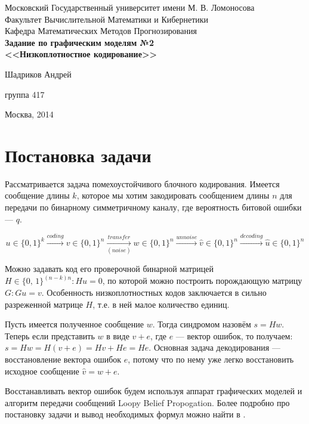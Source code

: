 \documentclass[12pt,a4paper]{article}
\begin{document}
\begin{titlepage}
\begin{center}
  Московский Государственный университет имени М. В. Ломоносова\\
  Факультет Вычислительной Математики и Кибернетики\\
  Кафедра Математических Методов Прогнозирования\\[30mm]

  \Large\bfseries
    Задание по графическим моделям №2\\[5mm]
    <<Низкоплотностное кодирование>>
  \\[40mm]
\end{center}
\begin{flushright}
  Шадриков Андрей

  группа 417
\end{flushright}
\center\vspace{\fill} 
  Москва, 2014
\end{titlepage}

\tableofcontents
\newpage

\section{Постановка задачи}

Рассматривается задача помехоустойчивого блочного кодирования.
Имеется сообщение длины $k$, которое мы хотим закодировать сообщением длины $n$ для передачи по бинарному симметричному каналу, где вероятность битовой ошибки --- $q$.

\[
  u \in \{0, 1\}^k \xrightarrow{coding} v \in \{0, 1\}^n \xrightarrow[(noise)]{transfer} w \in \{0, 1\}^n \xrightarrow{unnoise} \hat{v} \in \{0, 1\}^n \xrightarrow{decoding} \hat{u} \in \{0, 1\}^n
\]

Можно задавать код его проверочной бинарной матрицей $H \in \{0,\,1\}^{(n - k) n} : H u = 0$, по которой можно построить порождающую матрицу $G : G u = v$.
Особенность низкоплотностных кодов заключается в сильно разреженной матрице $H$, т.е. в ней малое количество единиц.

Пусть имеется полученное сообщение $w$.
Тогда синдромом назовём $s = H w$.
Теперь если представить $w$ в виде $v + e$, где $e$ --- вектор ошибок, то получаем: $s = H w = H (v + e) = H v + H e = H e$.
Основная задача декодирования --- восстановление вектора ошибок $e$, потому что по нему уже легко восстановить исходное сообщение $\hat{v} = w + e$.

Восстанавливать вектор ошибок будем используя аппарат графических моделей и алгоритм передачи сообщений Loopy Belief Propogation.
Более подробно про постановку задачи и вывод необходимых формул можно найти в \cite{task}.
\end{document}
